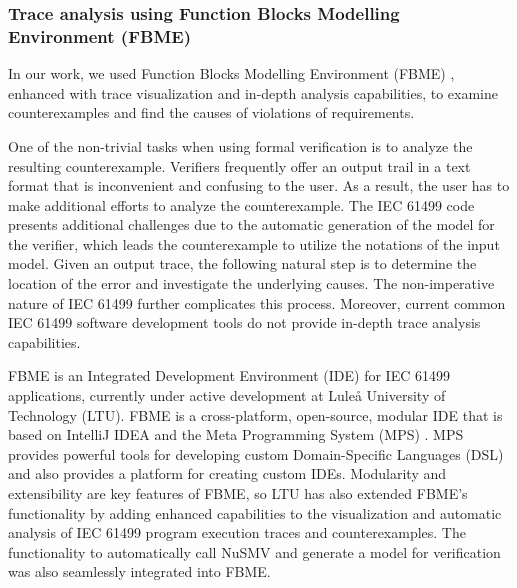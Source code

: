 \begin{bibunit}
\subsubsection*{Trace analysis using Function Blocks Modelling Environment (FBME)}
In our work, we used Function Blocks Modelling Environment (FBME) \cite{FBME}, enhanced with trace visualization and in-depth analysis capabilities, to examine counterexamples and find the causes of violations of requirements. 

One of the non-trivial tasks when using formal verification is to analyze the resulting counterexample. Verifiers frequently offer an output trail in a text format that is inconvenient and confusing to the user. As a result, the user has to make additional efforts to analyze the counterexample. 
The IEC 61499 code presents additional challenges due to the automatic generation of the model for the verifier, which leads the counterexample to utilize the notations of the input model. 
Given an output trace, the following natural step is to determine the location of the error and investigate the underlying causes. The non-imperative nature of IEC 61499 further complicates this process. Moreover, current common IEC 61499 software development tools do not provide in-depth trace analysis capabilities. 

FBME is an Integrated Development Environment (IDE) for IEC 61499 applications, currently under active development at Luleå University of Technology (LTU). FBME is a cross-platform, open-source, modular IDE that is based on IntelliJ IDEA and the Meta Programming System (MPS) \cite{mps}. MPS provides powerful tools for developing custom Domain-Specific Languages (DSL) and also provides a platform for creating custom IDEs. Modularity and extensibility are key features of FBME, so LTU has also extended FBME's functionality by adding enhanced capabilities to the visualization and automatic analysis of IEC 61499 program execution traces and counterexamples. 
The functionality to automatically call NuSMV and generate a model for verification was also seamlessly integrated into FBME.

\newpage


\end{bibunit}
